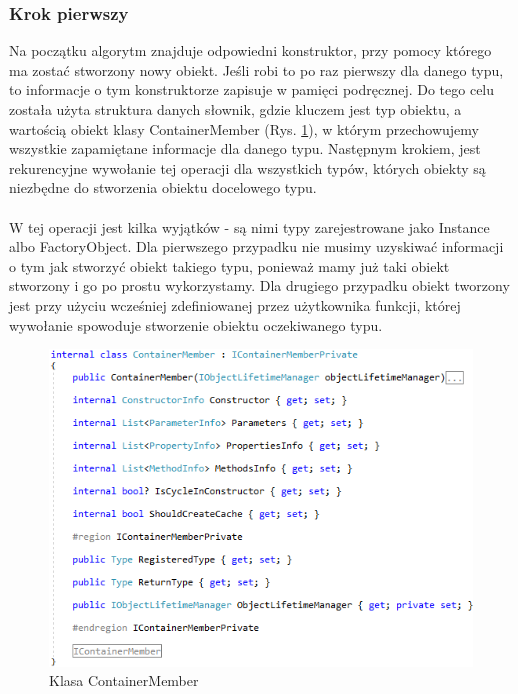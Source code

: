 \documentclass[12pt]{article}
\begin{document}
\subsubsection{Krok pierwszy}
Na początku algorytm znajduje odpowiedni konstruktor, przy pomocy którego ma zostać stworzony nowy obiekt. Jeśli robi to po raz pierwszy dla danego typu, to informacje o tym konstruktorze zapisuje w pamięci podręcznej. Do tego celu została użyta struktura danych słownik, gdzie kluczem jest typ obiektu, a wartością obiekt klasy ContainerMember (Rys. \ref{fig:ContainerMember}), w którym przechowujemy wszystkie zapamiętane informacje dla danego typu. Następnym krokiem, jest rekurencyjne wywołanie tej operacji dla wszystkich typów, których obiekty są niezbędne do stworzenia obiektu docelowego typu.\\
\\
W tej operacji jest kilka wyjątków - są nimi typy zarejestrowane jako Instance albo FactoryObject. Dla pierwszego przypadku nie musimy uzyskiwać informacji o tym jak stworzyć obiekt takiego typu, ponieważ mamy już taki obiekt stworzony i go po prostu wykorzystamy. Dla drugiego przypadku obiekt tworzony jest przy użyciu wcześniej zdefiniowanej przez użytkownika funkcji, której wywołanie spowoduje stworzenie obiektu oczekiwanego typu.
\begin{figure}[H]
	\begin{center}
  		\includegraphics{ContainerMember.png}
  		\caption{Klasa ContainerMember}
  		\label{fig:ContainerMember}
	\end{center}
\end{figure}
\end{document}
